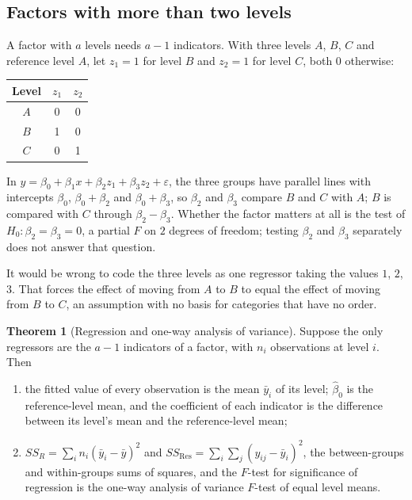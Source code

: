 \documentclass[11pt,a4paper]{article}
\numberwithin{equation}{section}
\theoremstyle{definition}
\newtheorem{thm}{Theorem}[subsection]
\begin{document}
\subsection{Factors with more than two levels}
A factor with $a$ levels needs $a - 1$ indicators. With three levels $A$, $B$, $C$ and reference level $A$, let
$z_1 = 1$ for level $B$ and $z_2 = 1$ for level $C$, both $0$ otherwise:
\begin{center}
\begin{tabular}{c|cc}
Level & $z_1$ & $z_2$ \\
\hline
$A$ & 0 & 0 \\
$B$ & 1 & 0 \\
$C$ & 0 & 1 \\
\end{tabular}
\end{center}
In $y = \beta_0 + \beta_1x + \beta_2z_1 + \beta_3z_2 + \varepsilon$, the three groups have parallel lines with intercepts
$\beta_0$, $\beta_0 + \beta_2$ and $\beta_0 + \beta_3$, so $\beta_2$ and $\beta_3$ compare $B$ and $C$ with $A$; $B$ is compared with $C$
through $\beta_2 - \beta_3$. Whether the factor matters at all is the test of $H_0\colon \beta_2 = \beta_3 = 0$, a partial $F$
on $2$ degrees of freedom; testing $\beta_2$ and $\beta_3$ separately does not answer that question.

It would be wrong to code the three levels as one regressor taking the values $1$, $2$, $3$. That forces the
effect of moving from $A$ to $B$ to equal the effect of moving from $B$ to $C$, an assumption with no basis for
categories that have no order.

\begin{thm}[Regression and one-way analysis of variance]\label{thm:oneway}
Suppose the only regressors are the $a - 1$ indicators of a factor, with $n_i$ observations at level $i$. Then
\begin{enumerate}[label=(\roman*)]
\item the fitted value of every observation is the mean $\bar y_i$ of its level; $\hat\beta_0$ is the reference-level
mean, and the coefficient of each indicator is the difference between its level's mean and the
reference-level mean;
\item $SS_R = \sum_i n_i(\bar y_i - \bar y)^2$ and $SS_{\mathrm{Res}} = \sum_i\sum_j(y_{ij} - \bar y_i)^2$, the between-groups and
within-groups sums of squares, and the $F$-test for significance of regression is the one-way analysis of
variance $F$-test of equal level means.
\end{enumerate}
\end{thm}
\end{document}
